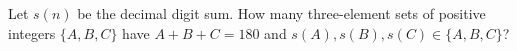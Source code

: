 Let $ s(n)$ be the decimal digit sum. How many three-element sets of positive integers $\{A,B,C\}$ have $ A+B+C=180 $ and $ s(A),s(B),s(C)\in\{A,B,C\}$?
